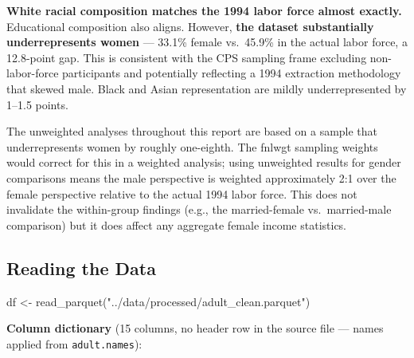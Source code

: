 \documentclass[
  letterpaper,
  DIV=11,
  numbers=noendperiod]{scrartcl}
\newenvironment{Shaded}{\begin{snugshade}}{\end{snugshade}}
\newcommand{\FunctionTok}[1]{\textcolor[rgb]{0.28,0.35,0.67}{#1}}
\newcommand{\NormalTok}[1]{\textcolor[rgb]{0.00,0.23,0.31}{#1}}
\newcommand{\OtherTok}[1]{\textcolor[rgb]{0.00,0.23,0.31}{#1}}
\newcommand{\StringTok}[1]{\textcolor[rgb]{0.13,0.47,0.30}{#1}}
\begin{document}
\textbf{White racial composition matches the 1994 labor force almost
exactly.} Educational composition also aligns. However, \textbf{the
dataset substantially underrepresents women} --- 33.1\% female
vs.~45.9\% in the actual labor force, a 12.8-point gap. This is
consistent with the CPS sampling frame excluding non-labor-force
participants and potentially reflecting a 1994 extraction methodology
that skewed male. Black and Asian representation are mildly
underrepresented by 1--1.5 points.

The unweighted analyses throughout this report are based on a sample
that underrepresents women by roughly one-eighth. The fnlwgt sampling
weights would correct for this in a weighted analysis; using unweighted
results for gender comparisons means the male perspective is weighted
approximately 2:1 over the female perspective relative to the actual
1994 labor force. This does not invalidate the within-group findings
(e.g., the married-female vs.~married-male comparison) but it does
affect any aggregate female income statistics.

\subsection{Reading the Data}\label{reading-the-data}

\begin{Shaded}
\begin{Highlighting}[]
\NormalTok{df }\OtherTok{\textless{}{-}} \FunctionTok{read\_parquet}\NormalTok{(}\StringTok{"../data/processed/adult\_clean.parquet"}\NormalTok{)}
\end{Highlighting}
\end{Shaded}

\textbf{Column dictionary} (15 columns, no header row in the source file
--- names applied from \texttt{adult.names}):
\end{document}
